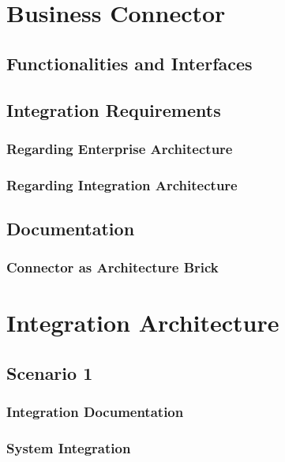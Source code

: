 \documentclass[
     12pt,         %
     a4paper,      %
     BCOR10mm,     %
     DIV14,        %
     ]{scrreprt}
\begin{document}
\chapter{Business Connector}

\section{Functionalities and Interfaces}

\section{Integration Requirements}

\subsection{Regarding Enterprise Architecture}

\subsection{Regarding Integration Architecture}

\section{Documentation}

\subsection{Connector as Architecture Brick}

\chapter{Integration Architecture}

\section{Scenario 1}

\subsection{Integration Documentation}

\subsection{System Integration}
\end{document}
